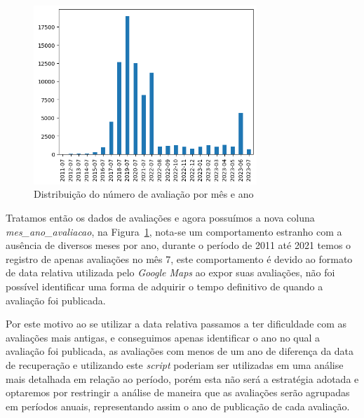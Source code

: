 \begin{figure}
	\centering
	\includegraphics[width=0.75\textwidth]{figs/exploratoria/distribuicao_ano_mes_avaliacao.png}
	\caption{Distribuição do número de avaliação por mês e ano}
	\label{img:dist_ano_mes_avaliacao}
\end{figure}

Tratamos então os dados de avaliações e agora possuímos a nova coluna \textit{mes\_ano\_avaliacao}, na Figura~\ref{img:dist_ano_mes_avaliacao}, nota-se um comportamento estranho com a ausência de diversos meses por ano, durante o período de 2011 até 2021 temos o registro de apenas avaliações no mês 7, este comportamento é devido ao formato de data relativa utilizada pelo \textit{Google Maps} ao expor suas avaliações, não foi possível identificar uma forma de adquirir o tempo definitivo de quando a avaliação foi publicada.

Por este motivo ao se utilizar a data relativa passamos a ter dificuldade com as avaliações mais antigas, e conseguimos apenas identificar o ano no qual a avaliação foi publicada, as avaliações com menos de um ano de diferença da data de recuperação e utilizando este \textit{script} poderiam ser utilizadas em uma análise mais detalhada em relação ao período, porém esta não será a estratégia adotada e optaremos por restringir a análise de maneira que as avaliações serão agrupadas em períodos anuais, representando assim o ano de publicação de cada avaliação.


